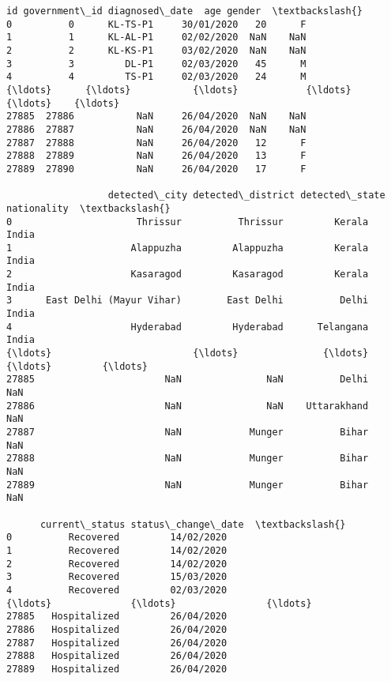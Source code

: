 \documentclass[11pt]{article}
\newcommand{\prompt}[4]{
        \llap{{\color{#2}[#3]: #4}}\vspace{-1.25em}
    }
\begin{document}
            \begin{tcolorbox}[breakable, boxrule=.5pt, size=fbox, pad at break*=1mm, opacityfill=0]
\prompt{Out}{outcolor}{97}{\hspace{3.5pt}}
\begin{Verbatim}[commandchars=\\\{\}]
          id government\_id diagnosed\_date  age gender  \textbackslash{}
0          0      KL-TS-P1     30/01/2020   20      F
1          1      KL-AL-P1     02/02/2020  NaN    NaN
2          2      KL-KS-P1     03/02/2020  NaN    NaN
3          3         DL-P1     02/03/2020   45      M
4          4         TS-P1     02/03/2020   24      M
{\ldots}      {\ldots}           {\ldots}            {\ldots}  {\ldots}    {\ldots}
27885  27886           NaN     26/04/2020  NaN    NaN
27886  27887           NaN     26/04/2020  NaN    NaN
27887  27888           NaN     26/04/2020   12      F
27888  27889           NaN     26/04/2020   13      F
27889  27890           NaN     26/04/2020   17      F

                  detected\_city detected\_district detected\_state nationality  \textbackslash{}
0                      Thrissur          Thrissur         Kerala       India
1                     Alappuzha         Alappuzha         Kerala       India
2                     Kasaragod         Kasaragod         Kerala       India
3      East Delhi (Mayur Vihar)        East Delhi          Delhi       India
4                     Hyderabad         Hyderabad      Telangana       India
{\ldots}                         {\ldots}               {\ldots}            {\ldots}         {\ldots}
27885                       NaN               NaN          Delhi         NaN
27886                       NaN               NaN    Uttarakhand         NaN
27887                       NaN            Munger          Bihar         NaN
27888                       NaN            Munger          Bihar         NaN
27889                       NaN            Munger          Bihar         NaN

      current\_status status\_change\_date  \textbackslash{}
0          Recovered         14/02/2020
1          Recovered         14/02/2020
2          Recovered         14/02/2020
3          Recovered         15/03/2020
4          Recovered         02/03/2020
{\ldots}              {\ldots}                {\ldots}
27885   Hospitalized         26/04/2020
27886   Hospitalized         26/04/2020
27887   Hospitalized         26/04/2020
27888   Hospitalized         26/04/2020
27889   Hospitalized         26/04/2020


\end{Verbatim}
\end{tcolorbox}
\end{document}
